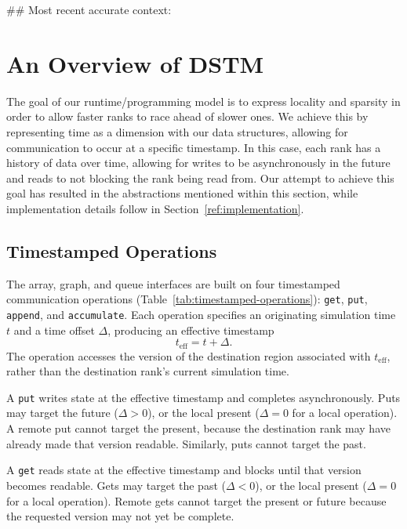 ## Most recent accurate context:

\section{An Overview of DSTM}
\label{ref:overview}
The goal of our runtime/programming model is to express locality and sparsity in order to allow faster ranks to race ahead of slower ones. We achieve this by representing time as a dimension with our data structures, allowing for communication to occur at a specific timestamp. In this case, each rank has a history of data over time, allowing for writes to be asynchronously in the future and reads to not blocking the rank being read from. Our attempt to achieve this goal has resulted in the abstractions mentioned within this section, while implementation details follow in Section~\ref{ref:implementation}.

\subsection{Timestamped Operations}


The array, graph, and queue interfaces are built on four timestamped
communication operations (Table~\ref{tab:timestamped-operations}):
\texttt{get}, \texttt{put}, \texttt{append}, and \texttt{accumulate}. Each operation specifies an originating
simulation time $t$ and a time offset $\Delta$, producing an effective
timestamp
\[
    t_{\mathrm{eff}} = t + \Delta .
\]
The operation accesses the version of the destination region associated
with $t_{\mathrm{eff}}$, rather than the destination rank's current
simulation time.

A \texttt{put} writes state at the effective timestamp and completes
asynchronously. Puts may target the future ($\Delta > 0$), or the local
present ($\Delta = 0$ for a local operation). A remote put cannot target
the present, because the destination rank may have already made that
version readable. Similarly, puts cannot target the past.

A \texttt{get} reads state at the effective timestamp and blocks until
that version becomes readable. Gets may target the past
($\Delta < 0$), or the local present ($\Delta = 0$ for a local
operation). Remote gets cannot target the present or future because the
requested version may not yet be complete.


